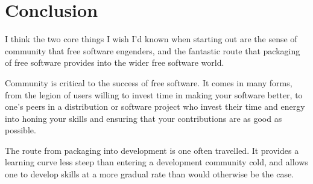 \section*{Conclusion}
I think the two core things I wish I’d known when starting out are the sense of community that free software engenders, and the fantastic route that packaging of free software provides into the wider free software world. 

Community is critical to the success of free software. It comes in many forms, from the legion of users willing to invest time in making your software better, to one’s peers in a distribution or software project who invest their time and energy into honing your skills and ensuring that your contributions are as good as possible. 

The route from packaging into development is one often travelled. It provides a learning curve less steep than entering a development community cold, and allows one to develop skills at a more gradual rate than would otherwise be the case.  

